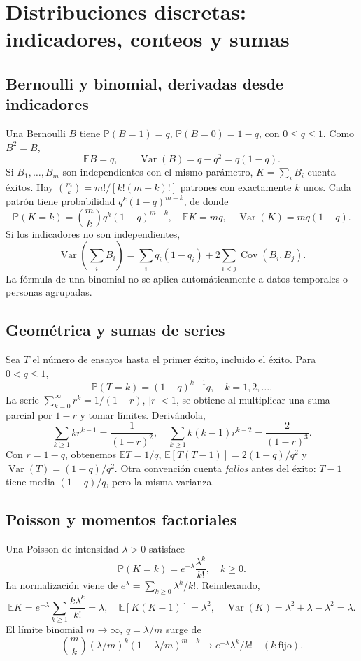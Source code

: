 \documentclass[11pt,a4paper]{article}
\newcommand{\E}{\mathbb E}
\newcommand{\Prob}{\mathbb P}
\DeclareMathOperator{\Var}{Var}
\DeclareMathOperator{\Cov}{Cov}
\theoremstyle{definition}
\begin{document}
\section{Distribuciones discretas: indicadores, conteos y sumas}
\subsection{Bernoulli y binomial, derivadas desde indicadores}
Una Bernoulli $B$ tiene $\Prob(B=1)=q$, $\Prob(B=0)=1-q$, con $0\le q\le1$. Como $B^2=B$,
\[
\E B=q,\qquad\Var(B)=q-q^2=q(1-q).
\]
Si $B_1,\ldots,B_m$ son independientes con el mismo parámetro, $K=\sum_i B_i$ cuenta éxitos. Hay $\binom mk=m!/[k!(m-k)!]$ patrones con exactamente $k$ unos. Cada patrón tiene probabilidad $q^k(1-q)^{m-k}$, de donde
\[
\Prob(K=k)=\binom mkq^k(1-q)^{m-k},\quad
\E K=mq,\quad\Var(K)=mq(1-q).
\]
Si los indicadores no son independientes,
\[
\Var\!\left(\sum_i B_i\right)=\sum_iq_i(1-q_i)+2\sum_{i<j}\Cov(B_i,B_j).
\]
La fórmula de una binomial no se aplica automáticamente a datos temporales o personas agrupadas.
\subsection{Geométrica y sumas de series}
Sea $T$ el número de ensayos hasta el primer éxito, incluido el éxito. Para $0<q\le1$,
\[
\Prob(T=k)=(1-q)^{k-1}q,\quad k=1,2,\ldots.
\]
La serie $\sum_{k=0}^\infty r^k=1/(1-r)$, $|r|<1$, se obtiene al multiplicar una suma parcial por $1-r$ y tomar límites. Derivándola,
\[
\sum_{k\ge1}kr^{k-1}=\frac1{(1-r)^2},\quad
\sum_{k\ge1}k(k-1)r^{k-2}=\frac2{(1-r)^3}.
\]
Con $r=1-q$, obtenemos $\E T=1/q$, $\E[T(T-1)]=2(1-q)/q^2$ y $\Var(T)=(1-q)/q^2$. Otra convención cuenta \emph{fallos} antes del éxito: $T-1$ tiene media $(1-q)/q$, pero la misma varianza.
\subsection{Poisson y momentos factoriales}
Una Poisson de intensidad $\lambda>0$ satisface
\[
\Prob(K=k)=e^{-\lambda}\frac{\lambda^k}{k!},\quad k\ge0.
\]
La normalización viene de $e^\lambda=\sum_{k\ge0}\lambda^k/k!$. Reindexando,
\[
\E K=e^{-\lambda}\sum_{k\ge1}\frac{k\lambda^k}{k!}=\lambda,
\quad\E[K(K-1)]=\lambda^2,
\quad\Var(K)=\lambda^2+\lambda-\lambda^2=\lambda.
\]
El límite binomial $m\to\infty$, $q=\lambda/m$ surge de
\[
\binom mk(\lambda/m)^k(1-\lambda/m)^{m-k}
\longrightarrow e^{-\lambda}\lambda^k/k!\quad(k\ \text{fijo}).
\]
\end{document}
